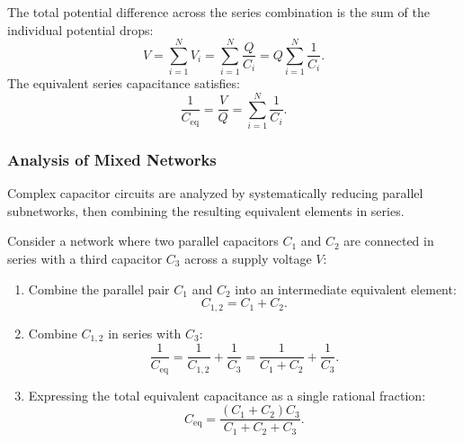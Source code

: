 The total potential difference across the series combination is the sum of the individual potential drops:
\begin{equation}
    V = \sum_{i=1}^N V_i = \sum_{i=1}^N \frac{Q}{C_i} = Q \sum_{i=1}^N \frac{1}{C_i}.
\end{equation}
The equivalent series capacitance satisfies:
\begin{equation}
    \frac{1}{C_{\text{eq}}} = \frac{V}{Q} = \sum_{i=1}^N \frac{1}{C_i}.
\end{equation}

\subsubsection{Analysis of Mixed Networks}

Complex capacitor circuits are analyzed by systematically reducing parallel subnetworks, then combining the resulting equivalent elements in series.

\begin{example}
    Consider a network where two parallel capacitors \(C_1\) and \(C_2\) are connected in series with a third capacitor \(C_3\) across a supply voltage \(V\):
    \begin{enumerate}
        \item Combine the parallel pair \(C_1\) and \(C_2\) into an intermediate equivalent element:
        \begin{equation}
            C_{1,2} = C_1 + C_2.
        \end{equation}
        \item Combine \(C_{1,2}\) in series with \(C_3\):
        \begin{equation}
            \frac{1}{C_{\text{eq}}} = \frac{1}{C_{1,2}} + \frac{1}{C_3} = \frac{1}{C_1 + C_2} + \frac{1}{C_3}.
        \end{equation}
        \item Expressing the total equivalent capacitance as a single rational fraction:
        \begin{equation}
            C_{\text{eq}} = \frac{(C_1 + C_2)C_3}{C_1 + C_2 + C_3}.
        \end{equation}
    \end{enumerate}
\end{example}
